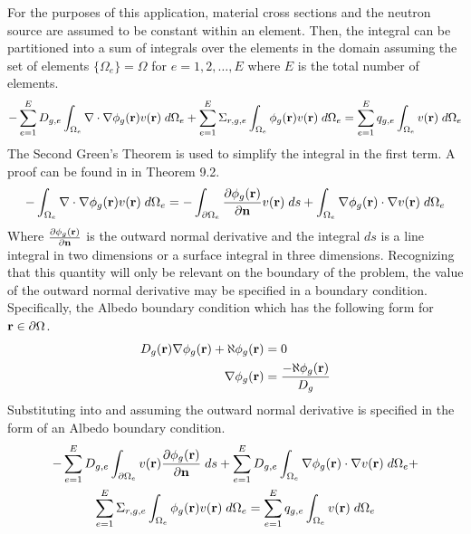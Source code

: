     For the purposes of this application, material cross sections and the
    neutron source are assumed to be constant within an element. Then, the 
    integral can be partitioned into a sum of integrals over the elements in the
    domain assuming the set of elements $\{\Omega_e\} = \Omega$ for 
    $e = 1,2,\ldots,E$ where $E$ is the total number of elements.
    \begin{equation} \label{eq:element_by_element}
      -\sum_{e=1}^{E} D_{g,e} 
        \int_{\Omega_e} \mathbf{\nabla} \cdot \mathbf{\nabla} \phi_g(\mathbf{r}) v(\mathbf{r}) \; d\Omega_e +
        \sum_{e=1}^{E} \Sigma_{r,g,e} \int_{\Omega_e} \phi_g(\mathbf{r}) v(\mathbf{r}) 
        \;d\Omega_e = \sum_{e=1}^{E} q_{g,e} \int_{\Omega_e} v(\mathbf{r}) 
        \; d\Omega_e
    \end{equation}
    The Second Green's Theorem is used to simplify the integral in the first
    term. A proof can be found in \cite{textbookli} in Theorem 9.2.
    \begin{equation} \label{eq:greens}
      -\int_{\Omega_e} \mathbf{\nabla} \cdot \mathbf{\nabla} \phi_g(\mathbf{r}) v(\mathbf{r}) \;d\Omega_e =
        -\int_{\partial \Omega_e}  
        \frac{\partial \phi_g(\mathbf{r})}{\partial \mathbf{n}} v(\mathbf{r})\; ds + \int_{\Omega_e} 
        \mathbf{\nabla} \phi_g(\mathbf{r}) \cdot \mathbf{\nabla} v(\mathbf{r}) \; d\Omega_e
    \end{equation}
    Where $\frac{\partial \phi_g(\mathbf{r})}{\partial \mathbf{n}}$ is the outward normal 
    derivative and the integral $ds$ is a line integral in two dimensions or a 
    surface integral in three dimensions. Recognizing that this quantity will 
    only be relevant on the boundary of the problem, the value of the outward 
    normal derivative may be specified in a boundary condition. Specifically, 
    the Albedo boundary condition which has the following form for $\mathbf{r} \in 
    \partial \Omega$. 
    \begin{align}
      D_g(\mathbf{r}) \mathbf{\nabla} \phi_g(\mathbf{r}) + \aleph \phi_g(\mathbf{r}) &= 0 \\
      \mathbf{\nabla} \phi_g(\mathbf{r}) &= \frac{-\aleph \phi_g(\mathbf{r})}{D_g}
    \end{align}
    Substituting  into   and 
    assuming the outward normal derivative is specified in the form of an Albedo
    boundary condition.
    \begin{multline} 
      -\sum_{e=1}^{E} D_{g,e} \int_{\partial \Omega_e} v(\mathbf{r}) 
        \frac{\partial \phi_g(\mathbf{r})}{\partial \mathbf{n}} \;ds + \sum_{e=1}^{E} D_{g,e}
        \int_{\Omega_e} \mathbf{\nabla} \phi_g(\mathbf{r}) \cdot \mathbf{\nabla} v(\mathbf{r}) \; d\Omega_e + \\
        \sum_{e=1}^{E} \Sigma_{r,g,e} \int_{\Omega_e} \phi_g(\mathbf{r}) v(\mathbf{r}) 
        \; d\Omega_e =
        \sum_{e=1}^{E} q_{g,e} \int_{\Omega_e} v(\mathbf{r}) \; d\Omega_e
    \end{multline}
